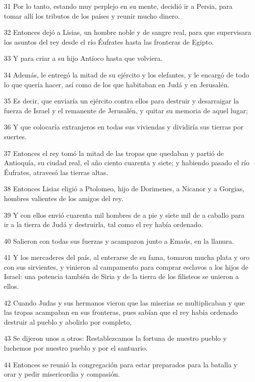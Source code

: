 \par 31 Por lo tanto, estando muy perplejo en su mente, decidió ir a Persia, para tomar allí los tributos de los países y reunir mucho dinero.
\par 32 Entonces dejó a Lisias, un hombre noble y de sangre real, para que supervisara los asuntos del rey desde el río Éufrates hasta las fronteras de Egipto.
\par 33 Y para criar a su hijo Antíoco hasta que volviera.
\par 34 Además, le entregó la mitad de su ejército y los elefantes, y le encargó de todo lo que quería hacer, así como de los que habitaban en Judá y en Jerusalén.
\par 35 Es decir, que enviaría un ejército contra ellos para destruir y desarraigar la fuerza de Israel y el remanente de Jerusalén, y quitar su memoria de aquel lugar;
\par 36 Y que colocaría extranjeros en todas sus viviendas y dividiría sus tierras por suertes.
\par 37 Entonces el rey tomó la mitad de las tropas que quedaban y partió de Antioquía, su ciudad real, el año ciento cuarenta y siete; y habiendo pasado el río Éufrates, atravesó las tierras altas.
\par 38 Entonces Lisias eligió a Ptolomeo, hijo de Dorimenes, a Nicanor y a Gorgias, hombres valientes de los amigos del rey.
\par 39 Y con ellos envió cuarenta mil hombres de a pie y siete mil de a caballo para ir a la tierra de Judá y destruirla, tal como el rey había ordenado.
\par 40 Salieron con todas sus fuerzas y acamparon junto a Emaús, en la llanura.
\par 41 Y los mercaderes del país, al enterarse de su fama, tomaron mucha plata y oro con sus sirvientes, y vinieron al campamento para comprar esclavos a los hijos de Israel: una potencia también de Siria y de la tierra de los filisteos se unieron a ellos.
\par 42 Cuando Judas y sus hermanos vieron que las miserias se multiplicaban y que las tropas acampaban en sus fronteras, pues sabían que el rey había ordenado destruir al pueblo y abolirlo por completo,
\par 43 Se dijeron unos a otros: Restablezcamos la fortuna de nuestro pueblo y luchemos por nuestro pueblo y por el santuario.
\par 44 Entonces se reunió la congregación para estar preparados para la batalla y orar y pedir misericordia y compasión.
